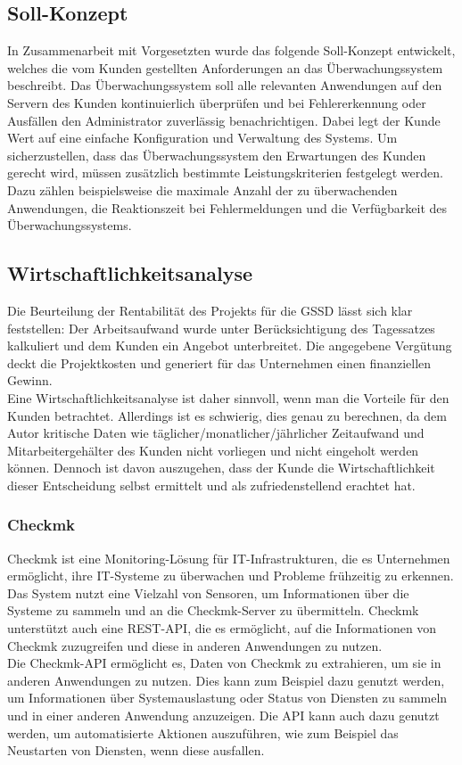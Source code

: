 \begin{flushleft}
\subsection{Soll-Konzept}
In Zusammenarbeit mit Vorgesetzten wurde das folgende Soll-Konzept entwickelt, welches die vom Kunden gestellten Anforderungen an das Überwachungssystem beschreibt.
Das Überwachungssystem soll alle relevanten Anwendungen auf den Servern des Kunden kontinuierlich überprüfen und bei Fehlererkennung oder Ausfällen den Administrator zuverlässig benachrichtigen. Dabei legt der Kunde Wert auf eine einfache Konfiguration und Verwaltung des Systems.
Um sicherzustellen, dass das Überwachungssystem den Erwartungen des Kunden gerecht wird, müssen zusätzlich bestimmte Leistungskriterien festgelegt werden. Dazu zählen beispielsweise die maximale Anzahl der zu überwachenden Anwendungen, die Reaktionszeit bei Fehlermeldungen und die Verfügbarkeit des Überwachungssystems.

\subsection{Wirtschaftlichkeitsanalyse}
Die Beurteilung der Rentabilität des Projekts für die \acs{GSSD} lässt sich klar feststellen: Der Arbeitsaufwand wurde unter Berücksichtigung des Tagessatzes kalkuliert und dem Kunden ein Angebot unterbreitet. Die angegebene Vergütung deckt die Projektkosten und generiert für das Unternehmen einen finanziellen Gewinn. \\
Eine Wirtschaftlichkeitsanalyse ist daher sinnvoll, wenn man die Vorteile für den Kunden betrachtet. Allerdings ist es schwierig, dies genau zu berechnen, da dem Autor kritische Daten wie täglicher/monatlicher/jährlicher Zeitaufwand und Mitarbeitergehälter des Kunden nicht vorliegen und nicht eingeholt werden können. Dennoch ist davon auszugehen, dass der Kunde die Wirtschaftlichkeit dieser Entscheidung selbst ermittelt und als zufriedenstellend erachtet hat.

\subsubsection{Checkmk}
Checkmk ist eine Monitoring-Lösung für IT-Infrastrukturen, die es Unternehmen ermöglicht, ihre IT-Systeme zu überwachen und Probleme frühzeitig zu erkennen.
Das System nutzt eine Vielzahl von Sensoren, um Informationen über die Systeme zu sammeln und an die Checkmk-Server zu übermitteln.
Checkmk unterstützt auch eine REST-API, die es ermöglicht, auf die Informationen von Checkmk zuzugreifen und diese in anderen Anwendungen zu nutzen.
\\
Die Checkmk-API ermöglicht es, Daten von Checkmk zu extrahieren, um sie in anderen Anwendungen zu nutzen.
Dies kann zum Beispiel dazu genutzt werden, um Informationen über Systemauslastung oder Status von Diensten zu sammeln und in einer anderen Anwendung anzuzeigen.
Die API kann auch dazu genutzt werden, um automatisierte Aktionen auszuführen, wie zum Beispiel das Neustarten von Diensten, wenn diese ausfallen.


\end{flushleft}
